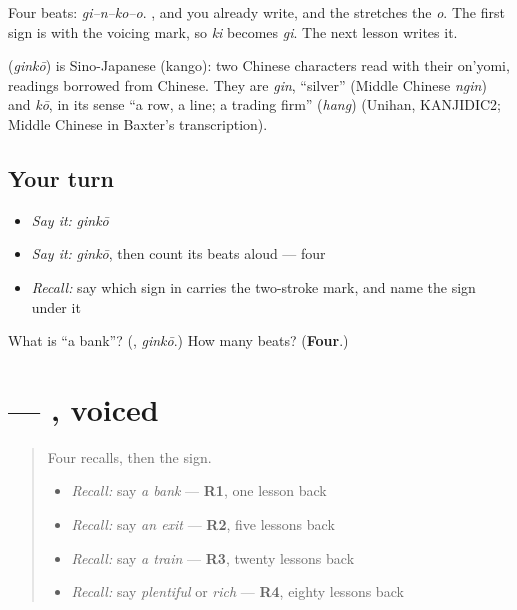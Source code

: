 Four beats: \emph{gi–n–ko–o}. \textbf{}, \textbf{} and \textbf{} you already write, and the \textbf{} stretches the \emph{o}. The first sign is \textbf{} with the voicing mark, so \emph{ki} becomes \emph{gi}. The next lesson writes it.

\begin{cousinweb}
\textbf{} (\emph{ginkō}) is Sino-Japanese (kango): two Chinese characters read with their on'yomi, readings borrowed from Chinese. They are \emph{gin}, \textquotedblleft{}silver\textquotedblright{} (Middle Chinese \emph{ngin}) and \emph{kō}, in its sense \textquotedblleft{}a row, a line; a trading firm\textquotedblright{} (\emph{hang}) (Unihan, KANJIDIC2; Middle Chinese in Baxter's transcription).
\end{cousinweb}

\subsection*{Your turn}
\begin{itemize}
\raggedright
  \item \emph{Say it:} \emph{ginkō}
  \item \emph{Say it:} \emph{ginkō}, then count its beats aloud — four
  \item \emph{Recall:} say which sign in \textbf{} carries the two-stroke mark, and name the sign under it
\end{itemize}

\begin{tcolorbox}[breakable,colback=teal!4,colframe=teal!35!black,title={Before you move on}]
What is \textquotedblleft{}a bank\textquotedblright{}? (\textbf{}, \emph{ginkō}.) How many beats? (\textbf{Four}.)
\end{tcolorbox}
\section[\texorpdfstring{\ja{ぎ} (gi)}{ぎ (gi)}]{ — , voiced}

\label{lesson:JA-W135-gi}



\begin{quote}
Four recalls, then the sign.

\begin{itemize}
\raggedright
  \item \emph{Recall:} say \emph{a bank} — \textbf{R1}, one lesson back
  \item \emph{Recall:} say \emph{an exit} — \textbf{R2}, five lessons back
  \item \emph{Recall:} say \emph{a train} — \textbf{R3}, twenty lessons back
  \item \emph{Recall:} say \emph{plentiful} or \emph{rich} — \textbf{R4}, eighty lessons back
\end{itemize}
\end{quote}

